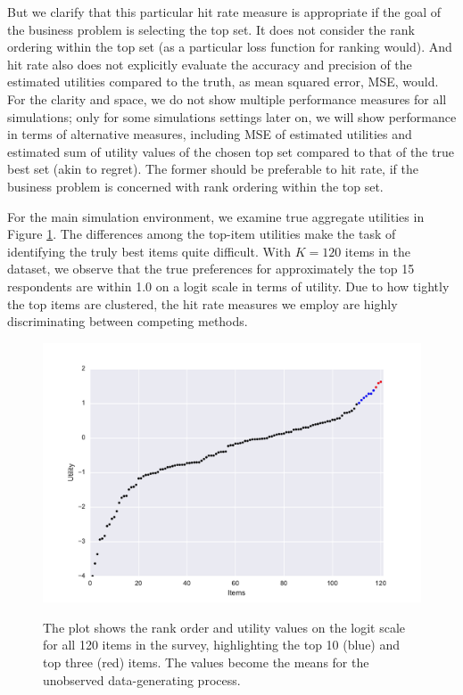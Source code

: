\documentclass[nonblindrev]{informs3}
\begin{document}
But we clarify that this particular hit rate measure is appropriate if the goal of the business problem is selecting the top set. It does not consider the rank ordering within the top set (as a particular loss function for ranking would). And hit rate also does not explicitly evaluate the accuracy and precision of the estimated utilities compared to the truth, as mean squared error, MSE, would.  For the clarity and space, we do not show multiple performance measures for all simulations; only for some simulations settings later on, we will show performance in terms of alternative measures, including MSE of estimated utilities and estimated sum of utility values of the chosen top set compared to that of the true best set (akin to regret). The former should be preferable to hit rate, if the business problem is concerned with rank ordering within the top set.

For the main simulation environment, we examine true aggregate utilities in Figure \ref{fig:util}. The differences among the top-item utilities make the task of identifying the truly best items quite difficult. With $K=120$ items in the dataset, we observe that the true preferences for approximately the top 15 respondents are within 1.0 on a logit scale in terms of utility. Due to how tightly the top items are clustered, the hit rate measures we employ are highly discriminating between competing methods.

\begin{figure}[!ht]
\caption{The plot shows the rank order and utility values on the logit scale for all 120 items in the survey, highlighting the top 10 (blue) and top three (red) items. The values become the means for the unobserved data-generating process.}
\includegraphics[width=1\textwidth]{plots/utilscore.pdf}
\label{fig:util} 
\end{figure}
\end{document}
